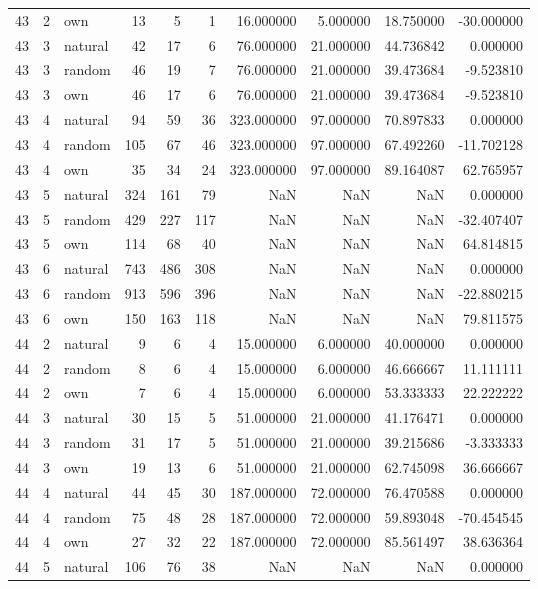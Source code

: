 \begin{table}[htbp]
\begin{tabular}{rrlrrrrrrr}
43 & 2 & own & 13 & 5 & 1 & 16.000000 & 5.000000 & 18.750000 & -30.000000 \\
43 & 3 & natural & 42 & 17 & 6 & 76.000000 & 21.000000 & 44.736842 & 0.000000 \\
43 & 3 & random & 46 & 19 & 7 & 76.000000 & 21.000000 & 39.473684 & -9.523810 \\
43 & 3 & own & 46 & 17 & 6 & 76.000000 & 21.000000 & 39.473684 & -9.523810 \\
43 & 4 & natural & 94 & 59 & 36 & 323.000000 & 97.000000 & 70.897833 & 0.000000 \\
43 & 4 & random & 105 & 67 & 46 & 323.000000 & 97.000000 & 67.492260 & -11.702128 \\
43 & 4 & own & 35 & 34 & 24 & 323.000000 & 97.000000 & 89.164087 & 62.765957 \\
43 & 5 & natural & 324 & 161 & 79 & NaN & NaN & NaN & 0.000000 \\
43 & 5 & random & 429 & 227 & 117 & NaN & NaN & NaN & -32.407407 \\
43 & 5 & own & 114 & 68 & 40 & NaN & NaN & NaN & 64.814815 \\
43 & 6 & natural & 743 & 486 & 308 & NaN & NaN & NaN & 0.000000 \\
43 & 6 & random & 913 & 596 & 396 & NaN & NaN & NaN & -22.880215 \\
43 & 6 & own & 150 & 163 & 118 & NaN & NaN & NaN & 79.811575 \\
44 & 2 & natural & 9 & 6 & 4 & 15.000000 & 6.000000 & 40.000000 & 0.000000 \\
44 & 2 & random & 8 & 6 & 4 & 15.000000 & 6.000000 & 46.666667 & 11.111111 \\
44 & 2 & own & 7 & 6 & 4 & 15.000000 & 6.000000 & 53.333333 & 22.222222 \\
44 & 3 & natural & 30 & 15 & 5 & 51.000000 & 21.000000 & 41.176471 & 0.000000 \\
44 & 3 & random & 31 & 17 & 5 & 51.000000 & 21.000000 & 39.215686 & -3.333333 \\
44 & 3 & own & 19 & 13 & 6 & 51.000000 & 21.000000 & 62.745098 & 36.666667 \\
44 & 4 & natural & 44 & 45 & 30 & 187.000000 & 72.000000 & 76.470588 & 0.000000 \\
44 & 4 & random & 75 & 48 & 28 & 187.000000 & 72.000000 & 59.893048 & -70.454545 \\
44 & 4 & own & 27 & 32 & 22 & 187.000000 & 72.000000 & 85.561497 & 38.636364 \\
44 & 5 & natural & 106 & 76 & 38 & NaN & NaN & NaN & 0.000000 \\

\end{tabular}
\end{table}
